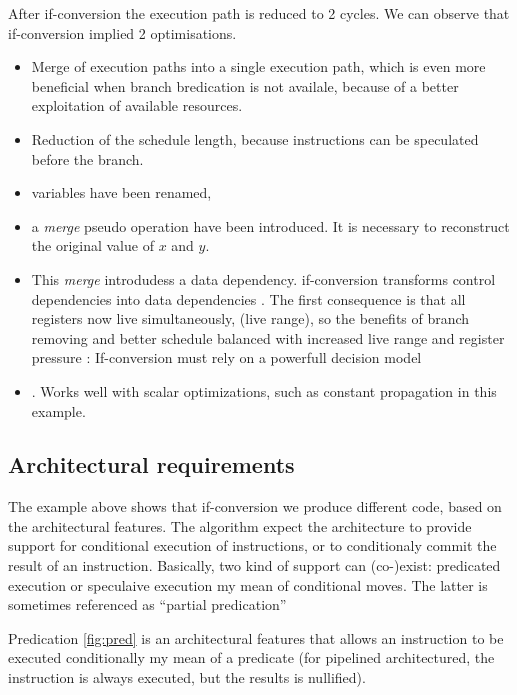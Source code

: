 After if-conversion the execution path is reduced to 2 cycles. We can observe that if-conversion implied 2 optimisations.
\begin{itemize}
\item  Merge of execution paths into a single execution path, which is even more beneficial when branch bredication is not availale, because of a better exploitation of available resources.  
\item Reduction of the schedule length, because instructions can be speculated before the branch.
\end{itemize}

\begin{itemize}
\item variables have been renamed, 
\item a \textit{merge} pseudo operation have been introduced. It is necessary to reconstruct the original value of $x$ and $y$.
\item This \textit{merge} introdudess a data dependency. if-conversion transforms control dependencies into data dependencies \cite{Allen:1983:CCD:567067.567085}. The first consequence is that all registers now live simultaneously, (live range), so the benefits of branch removing and better schedule balanced with increased live range and register pressure : If-conversion must rely on a powerfull decision model
\item. Works well with scalar optimizations, such as constant propagation in this example.
\end{itemize}

\subsection{Architectural requirements}
The example above shows that if-conversion we produce different code, based on the architectural features. The algorithm expect the architecture to provide support for conditional execution of instructions, or to conditionaly commit the result of an instruction.
Basically, two kind of support can (co-)exist: predicated execution or speculaive execution my mean of conditional moves. The latter is sometimes referenced as ``partial predication''

Predication \ref{fig:pred} is an architectural features that allows an instruction to be executed conditionally my mean of a predicate (for pipelined architectured, the instruction is always executed, but the results is nullified). 

